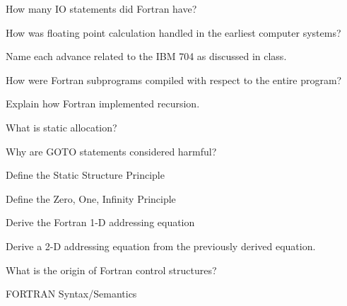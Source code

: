 \documentclass{exam} %
\begin{document}
\begin{questions}
  \question How many IO statements did Fortran have?

  \question How was floating point calculation handled in the earliest computer systems?

  \question Name each advance related to the IBM 704 as discussed in class.

  \question How were Fortran subprograms compiled with respect to the entire program?

  \question Explain how Fortran implemented recursion.

  \question What is static allocation?

  \question Why are GOTO statements considered harmful?

  \question Define the Static Structure Principle

  \question Define the Zero, One, Infinity Principle

  \question Derive the Fortran 1-D addressing equation

  \question Derive a 2-D addressing equation from the previously derived equation.

  \question What is the origin of Fortran control structures?

  \pagebreak

  \question FORTRAN Syntax/Semantics
\end{questions}
\end{document}
